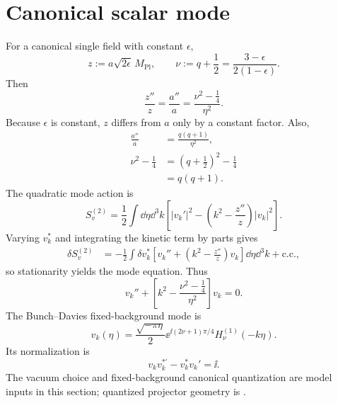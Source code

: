 \section{Canonical scalar mode}
For a canonical single field with constant \(\epsilon\),
\begin{equation}
z:=a\sqrt{2\epsilon}\,M_{\mathrm{Pl}},
\qquad
\nu:=q+\frac12=\frac{3-\epsilon}{2(1-\epsilon)}.
\end{equation}
Then
\begin{equation}
\boxed{
\frac{z''}{z}
=\frac{a''}{a}
=\frac{\nu^2-\frac14}{\eta^2}.
}
\end{equation}
Because \(\epsilon\) is constant, \(z\) differs from \(a\) only by a constant factor.  Also,
\begin{align}
\frac{a''}{a}
&=\frac{q(q+1)}{\eta^2},\\
\nu^2-\frac14
&=\left(q+\frac12\right)^2-\frac14\\
&=q(q+1).
\end{align}
The quadratic mode action is
\begin{equation}
S_v^{(2)}
=\frac12\int\dd\eta\dd^3k
\left[
|v_k'|^2-
\left(k^2-\frac{z''}{z}\right)|v_k|^2
\right].
\end{equation}
Varying \(v_k^*\) and integrating the kinetic term by parts gives
\begin{align}
\delta S_v^{(2)}
&=
-\frac12\int
\delta v_k^*
\left[
v_k''+\left(k^2-\frac{z''}{z}\right)v_k
\right]\dd\eta\dd^3k
+\text{c.c.},
\end{align}
so stationarity yields the mode equation.
Thus
\begin{equation}
\boxed{
v_k''+
\left[k^2-\frac{\nu^2-\frac14}{\eta^2}\right]v_k=0.
}
\end{equation}
The Bunch--Davies fixed-background mode is
\begin{equation}
\boxed{
v_k(\eta)
=\frac{\sqrt{-\pi\eta}}2
\ee^{\ii(2\nu+1)\pi/4}
H_\nu^{(1)}(-k\eta).
}
\end{equation}
Its normalization is
\begin{equation}
v_kv_k^{*\prime}-v_k^*v_k'=\ii.
\end{equation}
The vacuum choice and fixed-background canonical quantization are model inputs in this section;  quantized projector geometry is .

